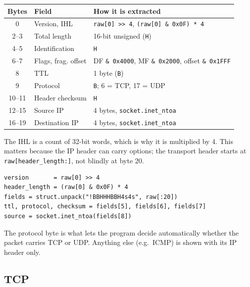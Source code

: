 \documentclass[11pt,a4paper]{article}
\begin{document}
\begin{center}
\begin{tabular}{@{}cll@{}}
\toprule
\textbf{Bytes} & \textbf{Field} & \textbf{How it is extracted} \\
\midrule
0      & Version, IHL        & \texttt{raw[0] >> 4}, \;\texttt{(raw[0] \& 0x0F) * 4} \\
2--3   & Total length        & 16-bit unsigned (\texttt{H}) \\
4--5   & Identification      & \texttt{H} \\
6--7   & Flags, frag. offset & DF \texttt{\& 0x4000}, MF \texttt{\& 0x2000}, offset \texttt{\& 0x1FFF} \\
8      & TTL                 & 1 byte (\texttt{B}) \\
9      & Protocol            & \texttt{B}; 6 = TCP, 17 = UDP \\
10--11 & Header checksum     & \texttt{H} \\
12--15 & Source IP           & 4 bytes, \texttt{socket.inet\_ntoa} \\
16--19 & Destination IP      & 4 bytes, \texttt{socket.inet\_ntoa} \\
\bottomrule
\end{tabular}
\end{center}

The IHL is a count of 32-bit words, which is why it is multiplied by 4. This
matters because the IP header can carry options; the transport header starts at
\texttt{raw[header\_length:]}, not blindly at byte 20.

\begin{lstlisting}[style=py]
version       = raw[0] >> 4
header_length = (raw[0] & 0x0F) * 4
fields = struct.unpack("!BBHHHBBH4s4s", raw[:20])
ttl, protocol, checksum = fields[5], fields[6], fields[7]
source = socket.inet_ntoa(fields[8])
\end{lstlisting}

The protocol byte is what lets the program decide automatically whether the
packet carries TCP or UDP. Anything else (e.g.\ ICMP) is shown with its IP
header only.

\subsection{TCP}
\end{document}
